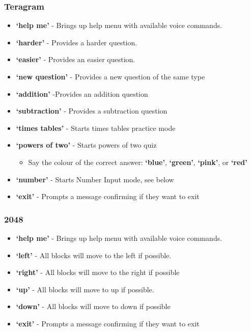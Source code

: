 \documentclass[11pt, oneside]{article}
\begin{document}
\subsubsection{Teragram}

\begin{itemize}
  \item {\bf`help me'} - Brings up help menu with available voice commands. 
  \item {\bf`harder'} - Provides a harder question. 
  \item {\bf`easier'} - Provides an easier question.
  \item {\bf`new question'} - Provides a new question of the same type
  \item {\bf`addition'} -Provides an addition question
  \item {\bf`subtraction'} - Provides a subtraction question
  \item {\bf`times tables'} - Starts times tables practice mode
  \item {\bf`powers of two'} - Starts powers of two quiz
  \begin{itemize}
  	\item Say the colour of the correct answer: {\bf`blue'}, {\bf`green'}, {\bf`pink'}, or {\bf`red'}
  \end{itemize}
  \item {\bf`number'} - Starts Number Input mode, see below
  \item {\bf`exit'} - Prompts a message confirming if they want to exit
 
\end{itemize}

\subsubsection{2048}

\begin{itemize}
  	\item {\bf`help me'} - Brings up help menu with available voice commands. 
	\item {\bf`left'} - All blocks will move to the left if possible. 
	\item {\bf`right'} - All blocks will move to the right if possible
	\item {\bf`up'} - All blocks will move to up if possible. 
	\item {\bf`down'} - All blocks will move to down if possible
	\item {\bf`exit'} - Prompts a message confirming if they want to exit
	
\end{itemize}
\end{document}
